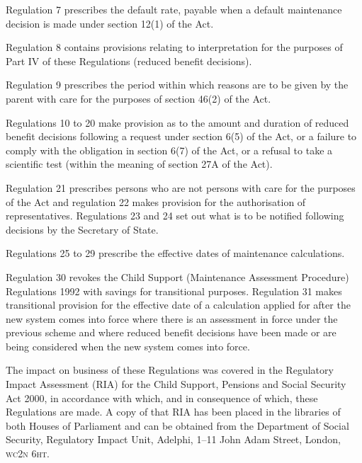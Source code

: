 \documentclass[12pt,a4paper]{article}
\begin{document}
Regulation 7 prescribes the default rate, payable when a default maintenance decision is made under section 12(1) of the Act.

Regulation 8 contains provisions relating to interpretation for the purposes of Part IV of these Regulations (reduced benefit decisions).

Regulation 9 prescribes the period within which reasons are to be given by the parent with care for the purposes of section 46(2) of the Act.

Regulations 10 to 20 make provision as to the amount and duration of reduced benefit decisions following a request under section 6(5) of the Act, or a failure to comply with the obligation in section 6(7) of the Act, or a refusal to take a scientific test (within the meaning of section 27A of the Act).

Regulation 21 prescribes persons who are not persons with care for the purposes of the Act and regulation 22 makes provision for the authorisation of representatives. Regulations 23 and 24 set out what is to be notified following decisions by the Secretary of State.

Regulations 25 to 29 prescribe the effective dates of maintenance calculations.

Regulation 30 revokes the Child Support (Maintenance Assessment Procedure) Regulations 1992 with savings for transitional purposes. Regulation 31 makes transitional provision for the effective date of a calculation applied for after the new system comes into force where there is an assessment in force under the previous scheme and where reduced benefit decisions have been made or are being considered when the new system comes into force.

The impact on business of these Regulations was covered in the Regulatory Impact Assessment (RIA) for the Child Support, Pensions and Social Security Act 2000, in accordance with which, and in consequence of which, these Regulations are made. A copy of that RIA has been placed in the libraries of both Houses of Parliament and can be obtained from the Department of Social Security, Regulatory Impact Unit, Adelphi, 1–11 John Adam Street, London, \textsc{\lowercase{WC2N 6HT}}. 
\end{document}
